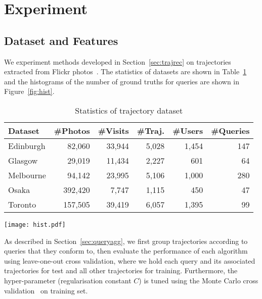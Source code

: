 \section{Experiment}
\label{sec:experiment}

\subsection{Dataset and Features}
\label{sec:dataset}

We experiment methods developed in Section~\ref{sec:trajrec} on trajectories extracted from Flickr photos~\cite{thomee2016yfcc100m}.
The statistics of datasets are shown in Table~\ref{tab:data} and 
the histograms of the number of ground truths for queries are shown in Figure~\ref{fig:hist}.

\begin{table}[t]
\caption{Statistics of trajectory dataset}
\label{tab:data}
\centering
\setlength{\tabcolsep}{4pt} %
\small
\begin{tabular}{l*{5}{r}} \hline
\textbf{Dataset} & \textbf{\#Photos} & \textbf{\#Visits} & \textbf{\#Traj.} & \textbf{\#Users} & \textbf{\#Queries} \\ \hline
Edinburgh & 82,060 & 33,944 & 5,028 & 1,454 & 147 \\
Glasgow & 29,019 & 11,434 & 2,227 & 601 & 64 \\
Melbourne & 94,142 & 23,995 & 5,106 & 1,000 & 280 \\
Osaka & 392,420 & 7,747 & 1,115 & 450 & 47 \\
Toronto & 157,505 & 39,419 & 6,057 & 1,395 & 99 \\
\hline
\end{tabular}
\end{table}


\begin{figure*}[t]
	\centering
	\texttt{[image: hist.pdf]}
	\caption{Histogram of the number of ground truth}
	\label{fig:hist}
\end{figure*}


As described in Section~\ref{sec:queryagg}, 
we first group trajectories according to queries that they conform to,
then evaluate the performance of each algorithm using leave-one-out cross validation,
where we hold each query and its associated trajectories for test and all other trajectories for training.
Furthermore, 
the hyper-parameter (regularisation constant $C$) is tuned using the Monte Carlo cross validation~\cite{burman1989comparative} on training set.

